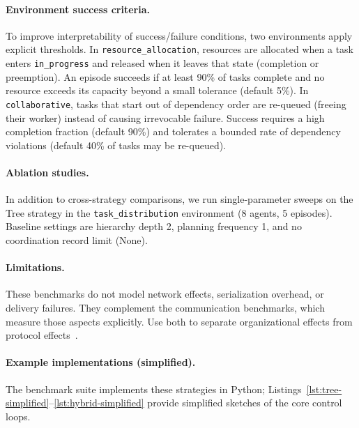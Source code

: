 \paragraph{Environment success criteria.}
To improve interpretability of success/failure conditions, two environments apply explicit thresholds. In \texttt{resource\_allocation}, resources are allocated when a task enters \texttt{in\_progress} and released when it leaves that state (completion or preemption). An episode succeeds if at least 90\% of tasks complete and no resource exceeds its capacity beyond a small tolerance (default 5\%). In \texttt{collaborative}, tasks that start out of dependency order are re-queued (freeing their worker) instead of causing irrevocable failure. Success requires a high completion fraction (default 90\%) and tolerates a bounded rate of dependency violations (default 40\% of tasks may be re-queued).

\paragraph{Ablation studies.}
In addition to cross-strategy comparisons, we run single-parameter sweeps on the Tree strategy in the \texttt{task\_distribution} environment (8 agents, 5 episodes). Baseline settings are hierarchy depth 2, planning frequency 1, and no coordination record limit (None).

\paragraph{Limitations.}
These benchmarks do not model network effects, serialization overhead, or delivery failures. They complement the communication benchmarks, which measure those aspects explicitly. Use both to separate organizational effects from protocol effects~\cite{VanSteenTanenbaum2017DistributedSystems,DeanBarroso2013TailAtScale}.

\paragraph{Example implementations (simplified).}
The benchmark suite implements these strategies in Python; Listings~\ref{lst:tree-simplified}--\ref{lst:hybrid-simplified} provide simplified sketches of the core control loops.


